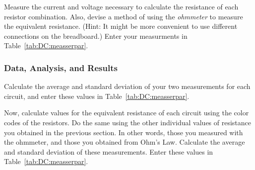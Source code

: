 Measure the 
current and voltage necessary to calculate the resistance of each resistor 
combination. Also, devise a method of using the {\it ohmmeter} to measure the 
equivalent resistance. (Hint: It might be more convenient to use different 
connections on the breadboard.) Enter your measurments in
Table~\ref{tab:DC:measserpar}.  

\subsubsection{Data, Analysis, and Results}
Calculate the average and standard deviation of your two measurements for each
circuit, and enter these values in Table~\ref{tab:DC:measserpar}. 

\noindent
Now, calculate
values for the equivalent resistance of each circuit using the color codes of the
resistors. Do the same using the other individual values of resistance you
obtained in the previous section. In other words, those you measured 
with the ohmmeter, and those you obtained from Ohm's Law. 
Calculate the average and standard deviation of these measurements.
Enter these values in Table~\ref{tab:DC:measserpar}. 
\indent
\newpage

